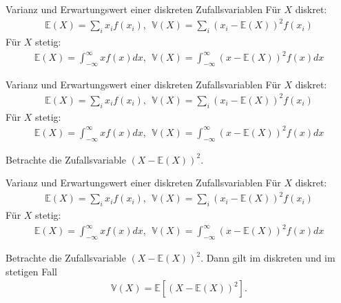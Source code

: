 \documentclass[t,11pt]{beamer}
\begin{document}
\begin{frame}
\begin{exampleblock}{Varianz und Erwartungswert einer diskreten Zufallsvariablen}
	Für $X$ diskret:
	\begin{align*}
	\mathbb{E}(X) = \sum_i x_i f(x_i), \ \
	\mathbb{V}(X) = \sum_i \left(x_i-\mathbb{E}(X)\right)^2 f(x_i)
	\end{align*}
	Für $X$ stetig:
	\begin{align*}
	\mathbb{E}(X) = \int_{-\infty}^{\infty} xf(x)dx, \ \
	\mathbb{V}(X) = \int_{-\infty}^{\infty} \left( x-\mathbb{E}(X) \right)^2 f(x)dx
	\end{align*}
\end{exampleblock}
\end{frame}

\begin{frame}
\begin{exampleblock}{Varianz und Erwartungswert einer diskreten Zufallsvariablen}
Für $X$ diskret:
	\begin{align*}
	\mathbb{E}(X) = \sum_i x_i f(x_i), \ \
	\mathbb{V}(X) = \sum_i \left(x_i-\mathbb{E}(X)\right)^2 f(x_i)
	\end{align*}
Für $X$ stetig:
	\begin{align*}
	\mathbb{E}(X) = \int_{-\infty}^{\infty} xf(x)dx, \ \
	\mathbb{V}(X) = \int_{-\infty}^{\infty} \left( x-\mathbb{E}(X) \right)^2 f(x)dx
	\end{align*}
\end{exampleblock}
Betrachte die Zufallsvariable $(X-\mathbb{E}(X))^2$.
\end{frame}

\begin{frame}
\begin{exampleblock}{Varianz und Erwartungswert einer diskreten Zufallsvariablen}
	Für $X$ diskret:
	\begin{align*}
	\mathbb{E}(X) = \sum_i x_i f(x_i), \ \
	\mathbb{V}(X) = \sum_i \left(x_i-\mathbb{E}(X)\right)^2 f(x_i)
	\end{align*}
	Für $X$ stetig:
	\begin{align*}
	\mathbb{E}(X) = \int_{-\infty}^{\infty} xf(x)dx, \ \
	\mathbb{V}(X) = \int_{-\infty}^{\infty} \left( x-\mathbb{E}(X) \right)^2 f(x)dx
	\end{align*}
\end{exampleblock}
Betrachte die Zufallsvariable $(X-\mathbb{E}(X))^2$. Dann gilt im diskreten und im stetigen Fall
\begin{align*}
\mathbb{V}(X) = \mathbb{E}\left[(X-\mathbb{E}(X))^2\right].
\end{align*}
\end{frame}
\end{document}
